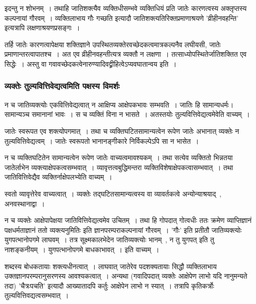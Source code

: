 				इदन्तु न शोभनम्~। तथाहि जातिशक्त्यैव व्यक्तिधीसम्भवे व्यक्तिधियं प्रति जातेः कारणत्वस्य अक्लृप्तस्य कल्पनायां गौरवम्~। व्यक्तिलाभाय गौः गच्छति इत्यादौ जातिशक्त्यतिरिक्तप्रमाणाश्रयणे 'व्रीहीनवहन्ति' इत्यत्रापि लक्षणाश्रयणप्रसङ्गः~।

				\begin{small}

					तर्हि जातेः कारणत्वापेक्षया शक्तिज्ञाने उपस्थितव्यक्तेरवच्छेदकत्वमात्रकल्पनैव लघीयसी, जातेः प्रमाणान्तरत्वापातश्च~। अत एव व्रीहीनवहन्तीत्यत्र व्यक्तौ न लक्षणा~। तत्साध्योपस्थितेर्जातिशक्तित एव सिद्धेः~। अस्तु वा गवावच्छेदकत्वेनारुण्यादिवद्व्रीहित्वेऽप्यवघातान्वय इति~।
				\end{small}

			\subsubsection{व्यक्तेः तुल्यवित्तिवेद्यत्वमिति पक्षस्य विमर्शः} 

				न च जातिव्यक्त्योः एकवित्तिवेद्यत्वात् न आक्षिप्य आक्षेपकभावः सम्भवति~। जातिः हि सामान्यधर्मः। सामान्यञ्च समानानां भावः~। स च व्यक्तिं विना न भासते~। अतस्तयोः तुल्यवित्तिवेद्यत्वमेवेति वाच्यम्~।

				जातेः स्वरूपत एव शक्त्योपगमात्~। तथा च व्यक्तिघटितसामान्यत्वेन रूपेण जातेः अभानात् व्यक्तेः न तुल्यवित्तिवेद्यत्वम्~। जातेः स्वरूपतो भानानङ्गीकारे निर्विकल्पेऽपि सा न भासेत~। 

				न च व्यक्तिघटितेन सामान्यत्वेन रूपेण जातेः वाच्यत्वमावश्यकम्~। तथा सत्येव व्यक्तितो भिन्नतया जातेर्लाभेन व्यक्त्याक्षेपकत्वसम्भवात्~। व्यावृत्तत्वबुद्धिमन्तरा व्यक्तिविशेषाक्षेपकत्वासम्भवात्~। तथा जातिवित्तिवेद्यैव व्यक्तिर्नाक्षेपलभ्येति वाच्यम्~। 

				स्वतो व्यावृत्तेरेव वाच्यत्वात्~। व्यक्तेः तद्घटितसामान्यत्वस्य वा व्यावर्तकत्वे अन्योन्याश्रयाद्~, अनवस्थानाद्वा~।

				न च व्यक्तेः आक्षेपापेक्षया जातिवित्तिवेद्यत्वमेव उचितम्~। तथा हि गोपदात् गोत्वधीः ततः क्रमेण व्याप्तिज्ञानं पक्षधर्मताज्ञानं ततो व्यक्त्यनुमितिः इति ज्ञानपरम्पराकल्पनायां गौरवम्~। 'गौः' इति प्रतीतौ जातिव्यक्त्योः युगपत्भानोपगमे लाघवम्~। तत्र सूक्ष्मकालभेदेन जातिव्यक्त्योः भानम्~, न तु युगपत् इति तु नाशङ्कनीयम्~। युगपत्भानोपगमे बाधकाभावत्~। इति वाच्यम्~।

				शब्दस्य बोधकतायाः शक्त्यधीनत्वात्~। लाघवात् जातेरेव पदशक्यतायाः सिद्धौ व्यक्तिलाभाय उक्तज्ञानपरम्परानुसरणस्य आवश्यकत्वात्~। अन्यथा (गवादिपदात् व्यक्तेः आक्षेपेण लाभो यदि नानुमन्यते तदा) 'चैत्रःपचति' इत्यादौ आख्यातादपि कर्तुः आक्षेपेन लाभो न स्यात्~। तत्रापि कृतिकर्त्रोः तुल्यवित्तिवद्यत्वसम्भवात्~। 

